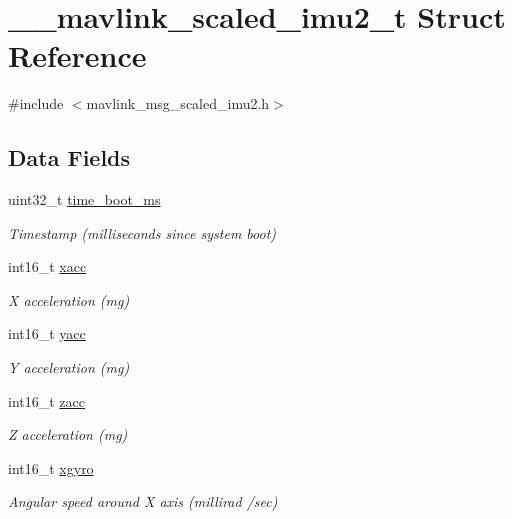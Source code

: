 \hypertarget{struct____mavlink__scaled__imu2__t}{\section{\+\_\+\+\_\+mavlink\+\_\+scaled\+\_\+imu2\+\_\+t Struct Reference}
\label{struct____mavlink__scaled__imu2__t}
}


{\ttfamily \#include $<$mavlink\+\_\+msg\+\_\+scaled\+\_\+imu2.\+h$>$}

\subsection*{Data Fields}
\begin{DoxyCompactItemize}
\item 
uint32\+\_\+t \hyperlink{struct____mavlink__scaled__imu2__t_ac9888bbb82d6d9f401bb24f96750c8b5}{time\+\_\+boot\+\_\+ms}
\begin{DoxyCompactList}\small\item\em Timestamp (milliseconds since system boot) \end{DoxyCompactList}\item 
int16\+\_\+t \hyperlink{struct____mavlink__scaled__imu2__t_a2c8c83e7ed02afb465ecc3460a2eb1c0}{xacc}
\begin{DoxyCompactList}\small\item\em X acceleration (mg) \end{DoxyCompactList}\item 
int16\+\_\+t \hyperlink{struct____mavlink__scaled__imu2__t_a4a0c2131afa7457a2aaeab7899e35c81}{yacc}
\begin{DoxyCompactList}\small\item\em Y acceleration (mg) \end{DoxyCompactList}\item 
int16\+\_\+t \hyperlink{struct____mavlink__scaled__imu2__t_a9562984cefad0bbce855164e3eca552d}{zacc}
\begin{DoxyCompactList}\small\item\em Z acceleration (mg) \end{DoxyCompactList}\item 
int16\+\_\+t \hyperlink{struct____mavlink__scaled__imu2__t_a8881bee7f341258b6dad3f0463f4c58f}{xgyro}
\begin{DoxyCompactList}\small\item\em Angular speed around X axis (millirad /sec) \end{DoxyCompactList}\item 

\end{DoxyCompactItemize}
